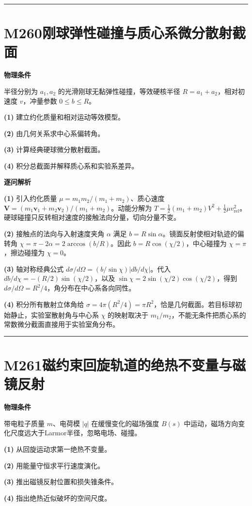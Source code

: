 \documentclass[UTF8,a4paper,11pt,oneside,openany]{ctexbook}
\begin{document}
\par\bigskip\hrule\bigskip
\section*{M260\quad 刚球弹性碰撞与质心系微分散射截面}
\textbf{物理条件}\par 半径分别为 \(a_1,a_2\) 的光滑刚球无黏弹性碰撞，等效硬核半径 \(R=a_1+a_2\)，相对初速度 \(v\)，冲量参数 \(0\le b\le R\)。
\par\noindent\textbf{(1)} 建立约化质量和相对运动等效模型。
\par\noindent\textbf{(2)} 由几何关系求中心系偏转角。
\par\noindent\textbf{(3)} 计算经典硬球微分散射截面。
\par\noindent\textbf{(4)} 积分总截面并解释质心系和实验系差异。

\par\medskip\noindent\textbf{逐问解析}
\par\noindent\textbf{(1)} 引入约化质量 \(\mu=m_1m_2/(m_1+m_2)\)、质心速度 \(\boldsymbol V=(m_1\boldsymbol v_1+m_2\boldsymbol v_2)/(m_1+m_2)\)。动能分解为 \(T=\tfrac12(m_1+m_2)V^2+\tfrac12\mu v_{\mathrm{rel}}^2\)。硬球碰撞只反转相对速度的接触法向分量，切向分量不变。
\par\noindent\textbf{(2)} 接触点的法向与入射速度夹角 \(\alpha\) 满足 \(b=R\sin\alpha\)。镜面反射使相对轨迹的偏转角 \(\chi=\pi-2\alpha=2\arccos(b/R)\)。因此 \(b=R\cos(\chi/2)\)，中心碰撞为 \(\chi=\pi\)，擦边碰撞为 \(\chi=0\)。
\par\noindent\textbf{(3)} 轴对称经典公式 \(d\sigma/d\Omega=(b/\sin\chi)|db/d\chi|\)。代入 \(db/d\chi=-(R/2)\sin(\chi/2)\)，以及 \(\sin\chi=2\sin(\chi/2)\cos(\chi/2)\)，得到 \(d\sigma/d\Omega=R^2/4\)，角分布在中心系各向同性。
\par\noindent\textbf{(4)} 积分所有散射立体角给 \(\sigma=4\pi(R^2/4)=\pi R^2\)，恰是几何截面。若目标球初始静止，实验室散射角与中心系 \(\chi\) 的映射取决于 \(m_1/m_2\)，不能无条件把质心系的常数微分截面直接用于实验室角分布。

\par\bigskip\hrule\bigskip
\section*{M261\quad 磁约束回旋轨道的绝热不变量与磁镜反射}
\textbf{物理条件}\par 带电粒子质量 \(m\)、电荷模 \(|q|\) 在缓慢变化的磁场强度 \(B(s)\) 中运动，磁场方向变化尺度远大于Larmor半径，忽略电场、碰撞。
\par\noindent\textbf{(1)} 从回旋运动求第一绝热不变量。
\par\noindent\textbf{(2)} 用能量守恒求平行速度演化。
\par\noindent\textbf{(3)} 推出磁镜反射位置和损失锥条件。
\par\noindent\textbf{(4)} 指出绝热近似破坏的空间尺度。
\end{document}

